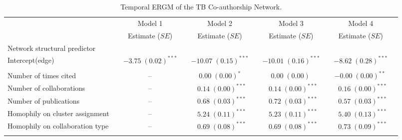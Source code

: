 \begin{table}
\begin{center}
\caption{Temporal ERGM of the TB Co-authorship Network.}
\label{tab:tb_tergm}
\hspace*{-1cm}
\scriptsize
\begin{tabular}{@{}lcclclclcl@{}}
        \toprule
           &  & Model 1 &  & Model 2  &  & Model 3 &  & Model 4\\ \cmidrule{3-3} \cmidrule{5-5} \cmidrule{7-7} \cmidrule{9-9}
           &  & Estimate ($SE$) &  & Estimate ($SE$)  &  & Estimate ($SE$) &  & Estimate ($SE$)\\
\midrule
Network structural predictor & & & & & & & & \\
\hspace{10pt}Intercept(edge)    &  & $-3.75 \; (0.02)^{***}$ & & $-10.07 \; (0.15)^{***}$ & & $-10.01 \; (0.16)^{***}$ & & $-8.62 \; (0.28)^{***}$ \\\\
Number of times cited       &  &       --    &  & $\hspace{6pt}0.00 \; (0.00)^{*~~~}$   &  & $\hspace{6pt}0.00 \; (0.00)^{~~~~}$      &  & $-0.00 \; (0.00)^{**~}$  \\
Number of collaborations    &  &         --  &  & $\hspace{6pt}0.14 \; (0.00)^{***}$ &  & $\hspace{6pt}0.14 \; (0.00)^{***}$ &  & $\hspace{6pt}0.16 \; (0.00)^{***}$  \\
Number of publications      &  &      --     &  & $\hspace{6pt}0.68 \; (0.03)^{***}$ &  & $\hspace{6pt}0.72 \; (0.03)^{***}$ &  & $\hspace{6pt}0.57 \; (0.03)^{***}$  \\
Homophily on cluster assignment   &  & --     &  & $\hspace{6pt}5.24 \; (0.11)^{***}$ &  & $\hspace{6pt}5.23 \; (0.11)^{***}$ &  & $\hspace{6pt}5.40 \; (0.13)^{***}$  \\
Homophily on collaboration type   &  &   --   &  & $\hspace{6pt}0.69 \; (0.08)^{***}$ &  & $\hspace{6pt}0.69 \; (0.08)^{***}$ &  & $\hspace{6pt}0.73 \; (0.09)^{***}$  \\\\

\end{tabular}
\end{center}
\end{table}
